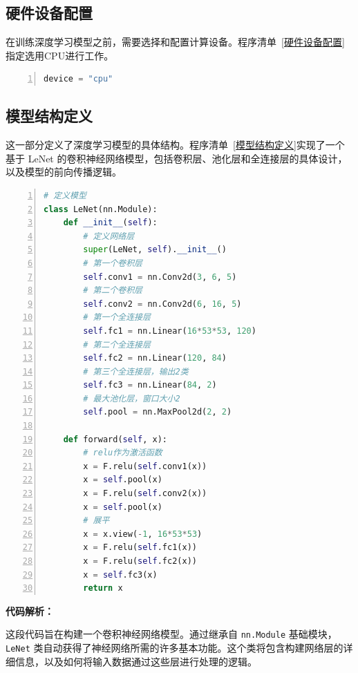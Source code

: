 \subsection{硬件设备配置}
在训练深度学习模型之前，需要选择和配置计算设备。程序清单~\ref{硬件设备配置}指定选用CPU进行工作。
\begin{lstlisting}[language={python},label={硬件设备配置},caption={硬件设备配置}, basicstyle=\footnotesize\ttfamily, breaklines=true, numbers=left, frame=single]
device = "cpu"
\end{lstlisting}
\subsection{模型结构定义}
这一部分定义了深度学习模型的具体结构。程序清单~\ref{模型结构定义}实现了一个基于 LeNet 的卷积神经网络模型，包括卷积层、池化层和全连接层的具体设计，以及模型的前向传播逻辑。

\begin{lstlisting}[language={python},label={模型结构定义},caption={模型结构定义}, basicstyle=\footnotesize\ttfamily, breaklines=true, numbers=left, frame=single,keepspaces=true,showstringspaces=false]
# 定义模型
class LeNet(nn.Module):
    def __init__(self):
        # 定义网络层
        super(LeNet, self).__init__()
        # 第一个卷积层
        self.conv1 = nn.Conv2d(3, 6, 5)        
        # 第二个卷积层
        self.conv2 = nn.Conv2d(6, 16, 5)  
        # 第一个全连接层
        self.fc1 = nn.Linear(16*53*53, 120)  
        # 第二个全连接层
        self.fc2 = nn.Linear(120, 84)  
        # 第三个全连接层，输出2类
        self.fc3 = nn.Linear(84, 2)        
        # 最大池化层，窗口大小2
        self.pool = nn.MaxPool2d(2, 2)           
    
    def forward(self, x):
        # relu作为激活函数
        x = F.relu(self.conv1(x))                
        x = self.pool(x)
        x = F.relu(self.conv2(x))
        x = self.pool(x)
        # 展平
        x = x.view(-1, 16*53*53)                 
        x = F.relu(self.fc1(x))
        x = F.relu(self.fc2(x))
        x = self.fc3(x)
        return x
\end{lstlisting}
\textbf{代码解析：}

这段代码旨在构建一个卷积神经网络模型。通过继承自 \texttt{nn.Module} 基础模块，\texttt{LeNet} 类自动获得了神经网络所需的许多基本功能。这个类将包含构建网络层的详细信息，以及如何将输入数据通过这些层进行处理的逻辑。

